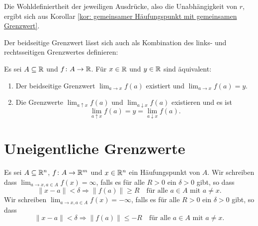 \documentclass[a4paper,10pt]{article}
\begin{document}
Die Wohldefiniertheit der jeweiligen Ausdrücke, also die Unabhängigkeit von $r$, ergibt sich aus Korollar \ref{kor: gemeinsamer Häufungspunkt mit gemeinsamen Grenzwert}.


Der beidseitige Grenzwert lässt sich auch als Kombination des links- und rechtsseitigen Grenzwertes definieren:


\begin{lem}
 Es sei $A \subseteq \mathbb{R}$ und $f \colon A \to \mathbb{R}$. Für $x \in \mathbb{R}$ und $y \in \mathbb{R}$ sind äquivalent:
 \begin{enumerate}
  \item
   Der beidseitige Grenzwert $\lim_{a \to x} f(a)$ existiert und $\lim_{a \to x} f(a) = y$.
  \item
   Die Grenzwerte $\lim_{a \uparrow x} f(a)$ und $\lim_{a \downarrow x} f(a)$ existieren und es ist
   \[
    \lim_{a \uparrow x} f(a) = y = \lim_{a \downarrow x} f(a).
   \]
 \end{enumerate}
\end{lem}





\section{Uneigentliche Grenzwerte}


\begin{defi}
 Es sei $A \subseteq \mathbb{R}^n$, $f \colon A \to \mathbb{R}^m$ und $x \in \mathbb{R}^n$ ein Häufungspunkt von $A$. Wir schreiben dass $\lim_{a \to x, a \in A} f(x) = \infty$, falls es für alle $R > 0$ ein $\delta > 0$ gibt, so dass
 \[
  \|x-a\| < \delta \Rightarrow \|f(a)\| \geq R \quad \text{für alle $a \in A$ mit $a \neq x$}.
 \]
 Wir schreiben $\lim_{a \to x, a \in A} f(x) = -\infty$, falls es für alle $R > 0$ ein $\delta > 0$ gibt, so dass
 \[
  \|x-a\| < \delta \Rightarrow \|f(a)\| \leq -R \quad \text{für alle $a \in A$ mit $a \neq x$}.
 \]
\end{defi}
\end{document}
